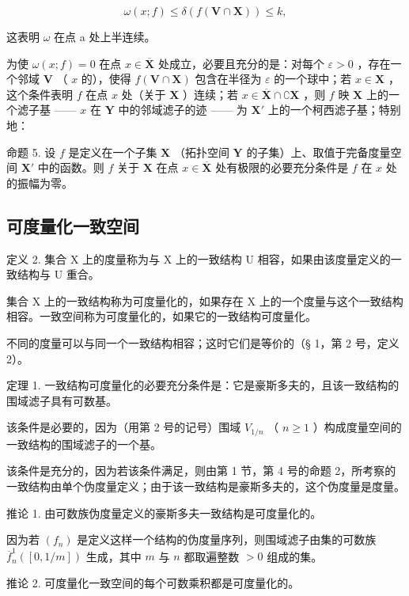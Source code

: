 \[
\omega (x; f) \leqslant \delta (f (\mathbf {V} \cap \mathbf {X})) \leqslant k,
\]

这表明 \(\omega\) 在点 a 处上半连续。

为使 \(\omega(x; f) = 0\) 在点 \(x \in \overline{\mathbf{X}}\) 处成立，必要且充分的是：对每个 \(\varepsilon > 0\) ，存在一个邻域 \(\mathbf{V}\) （ \(x\) 的），使得 \(f(\mathbf{V} \cap \mathbf{X})\) 包含在半径为 \(\varepsilon\) 的一个球中；若 \(x \in \mathbf{X}\) ，这个条件表明 \(f\) 在点 \(x\) 处（关于 \(\mathbf{X}\) ）连续；若 \(x \in \overline{\mathbf{X}} \cap \complement \mathbf{X}\) ，则 \(f\) 映 \(\mathbf{X}\) 上的一个滤子基 —— \(x\) 在 \(\mathbf{Y}\) 中的邻域滤子的迹 —— 为 \(\mathbf{X}'\) 上的一个柯西滤子基；特别地：

命题 5. 设 \(f\) 是定义在一个子集 \(\mathbf{X}\) （拓扑空间 \(\mathbf{Y}\) 的子集）上、取值于完备度量空间 \(\mathbf{X}'\) 中的函数。则 \(f\) 关于 \(\mathbf{X}\) 在点 \(x \in \overline{\mathbf{X}}\) 处有极限的必要充分条件是 \(f\) 在 \(x\) 处的振幅为零。

\subsection{可度量化一致空间}

定义 2. 集合 X 上的度量称为与 X 上的一致结构 U 相容，如果由该度量定义的一致结构与 U 重合。

集合 X 上的一致结构称为可度量化的，如果存在 X 上的一个度量与这个一致结构相容。一致空间称为可度量化的，如果它的一致结构可度量化。

不同的度量可以与同一个一致结构相容；这时它们是等价的（§ 1，第 2 号，定义 2）。

定理 1. 一致结构可度量化的必要充分条件是：它是豪斯多夫的，且该一致结构的围域滤子具有可数基。

该条件是必要的，因为（用第 2 号的记号）围域 \(V_{1/n}\) （ \(n \geqslant 1\) ）构成度量空间的一致结构的围域滤子的一个基。

该条件是充分的，因为若该条件满足，则由第 1 节，第 4 号的命题 2，所考察的一致结构由单个伪度量定义；由于该一致结构是豪斯多夫的，这个伪度量是度量。

推论 1. 由可数族伪度量定义的豪斯多夫一致结构是可度量化的。

因为若 \((f_n)\) 是定义这样一个结构的伪度量序列，则围域滤子由集的可数族 \(\overline{f}_n^1([0, 1/m])\) 生成，其中 \(m\) 与 \(n\) 都取遍整数 \(>0\) 组成的集。

推论 2. 可度量化一致空间的每个可数乘积都是可度量化的。

